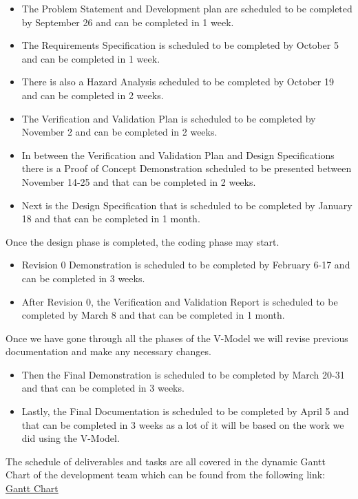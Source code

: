 \documentclass[12pt, titlepage]{article}
\begin{document}
\begin{itemize}
    \item The Problem Statement and Development plan are scheduled to be completed by September 26 and can be completed in 1 week. 
    \item The Requirements Specification is scheduled to be completed by October 5 and can be completed in 1 week. 
    \item There is also a Hazard Analysis scheduled to be completed by October 19 and can be completed in 2 weeks. 
    \item The Verification and Validation Plan is scheduled to be completed by November 2 and can be completed in 2 weeks. 
    \item In between the Verification and Validation Plan and Design Specifications there is a Proof of Concept Demonstration scheduled to be presented between November 14-25 and that can be completed in 2 weeks. 
    \item Next is the Design Specification that is scheduled to be completed by January 18 and that can be completed in 1 month.
\end{itemize}

Once the design phase is completed, the coding phase may start. 
\begin{itemize}
    \item Revision 0 Demonstration is scheduled to be completed by February 6-17 and can be completed in 3 weeks.
    \item After Revision 0, the Verification and Validation Report is scheduled to be completed by March 8 and that can be completed in 1 month.
\end{itemize}

Once we have gone through all the phases of the V-Model we will revise previous documentation and make any necessary changes. 

\begin{itemize}
    \item Then the Final Demonstration is scheduled to be completed by March 20-31 and that can be completed in 3 weeks.
    \item Lastly, the Final Documentation is scheduled to be completed by April 5 and that can be completed in 3 weeks as a lot of it will be based on the work we did using the V-Model.
\end{itemize}

The schedule of deliverables and tasks are all covered in the dynamic Gantt Chart of the development team which can be found from the following link:
\href{https://github.com/paezha/PyERT-BLACK/blob/main/docs/Project%20Schedule/Proejct%20schedule.pdf}{Gantt Chart}
\end{document}
